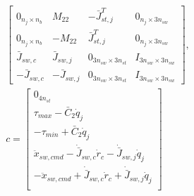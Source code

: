 \begin{itemize}
\begin{gather}
\begin{bmatrix}
            0_{n_j\times n_b} & M_{22} & -\bar{J}_{st,j}^{T} & 0_{n_j\times 3n_{sw}}\\
            0_{n_j\times n_b} & -M_{22} & \bar{J}_{st,j}^{T} & 0_{n_j\times 3n_{sw}}\\
            \bar{J}_{sw,c} & \bar{J}_{sw,j} & 0_{3n_{sw}\times 3n_{st}} & I_{3n_{sw}\times 3n_{sw}}\\
            -\bar{J}_{sw,c} & -\bar{J}_{sw,j} & 0_{3n_{sw}\times 3n_{st}} & I_{3n_{sw}\times 3n_{sw}}
        \end{bmatrix}, \\
        c=
        \begin{bmatrix}
            0_{4n_{st}}\\
            \tau_{max}-\bar{C}_{2}\dot{q}_{j}\\
            -\tau_{min}+\bar{C}_{2}\dot{q}_{j}\\
            \ddot{x}_{sw,cmd}-\dot{\bar{J}}_{sw,c}\dot{r}_{c}-\dot{\bar{J}}_{sw,j}\dot{q}_{j}\\
            -\ddot{x}_{sw,cmd}+\dot{\bar{J}}_{sw,c}\dot{r}_{c}+\dot{\bar{J}}_{sw,j}\dot{q}_{j}\\
        \end{bmatrix}
    \end{gather}
\end{itemize}

